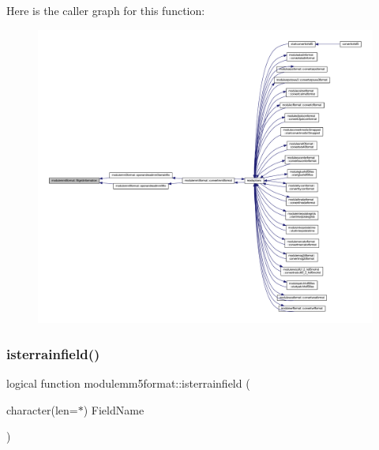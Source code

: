 Here is the caller graph for this function\+:\nopagebreak
\begin{figure}[H]
\begin{center}
\leavevmode
\includegraphics[width=350pt]{namespacemodulemm5format_a2871229a63fac4ca43cec154d7ed93d4_icgraph}
\end{center}
\end{figure}
\mbox{\label{namespacemodulemm5format_ae5ec2f854445619a5a7132875dc4d803}} 
\subsubsection{\texorpdfstring{isterrainfield()}{isterrainfield()}}
{\footnotesize\ttfamily logical function modulemm5format\+::isterrainfield (\begin{DoxyParamCaption}\item[{character(len=$\ast$)}]{Field\+Name }\end{DoxyParamCaption})\hspace{0.3cm}{\ttfamily [private]}}

